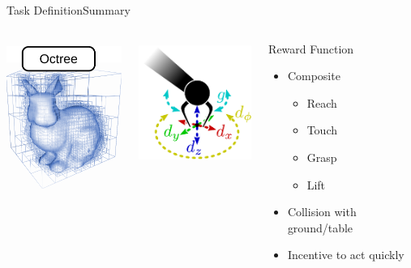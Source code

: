 \begin{frame}{Task Definition}{Summary}
    \begin{columns}%
        \begin{column}{0.3\textwidth}%
            \centering
            \includegraphics[height=5cm]{graphics/3d_data_representations_only_octree_cropped.pdf}
        \end{column}
        \begin{column}{0.3\textwidth}%
            \centering
            \includegraphics[height=4cm]{graphics/action_space.pdf}
        \end{column}
        \begin{column}{0.35\textwidth}%
            \begin{block}{Reward Function}
                \begin{itemize}
                    \item Composite
                          \begin{itemize}
                              \item Reach
                              \item Touch
                              \item Grasp
                              \item Lift
                          \end{itemize}
                    \item Collision with ground/table
                    \item Incentive to act quickly
                \end{itemize}
            \end{block}
        \end{column}
    \end{columns}
\end{frame}

